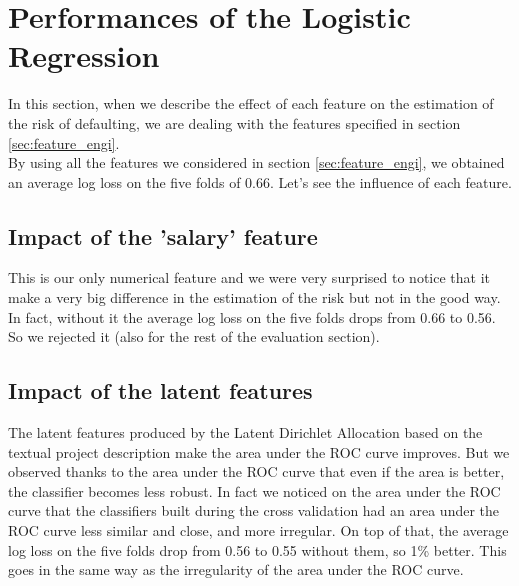 \section{Performances of the Logistic Regression}
	In this section, when we describe the effect of each feature on the estimation of the risk of defaulting, we are dealing with the features specified in section \ref{sec:feature_engi}.\\

	By using all the features we considered in section \ref{sec:feature_engi}, we obtained an average log loss on the five folds of 0.66. Let's see the influence of each feature.

	\subsection{Impact of the 'salary' feature}
		This is our only numerical feature and we were very surprised to notice that it make a very big difference in the estimation of the risk but not in the good way. In fact, without it the average log loss on the five folds drops from 0.66 to 0.56. So we rejected it (also for the rest of the evaluation section).

	\subsection{Impact of the latent features}
		The latent features produced by the Latent Dirichlet Allocation based on the textual project description make the area under the ROC curve improves. But we observed thanks to the area under the ROC curve that even if the area is better, the classifier becomes less robust. In fact we noticed on the area under the ROC curve that the classifiers built during the cross validation had an area under the ROC curve less similar and close, and more irregular.
		On top of that, the average log loss on the five folds drop from 0.56 to 0.55 without them, so 1\% better. This goes in the same way as the irregularity of the area under the ROC curve.\\

